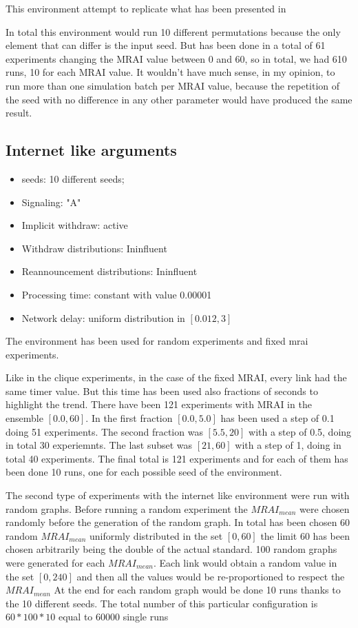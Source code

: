 \documentclass[10pt,conference,letterpaper]{IEEEtran}
\begin{document}
This environment attempt to replicate what has been presented in \cite{griffin2001experimental}

In total this environment would run 10 different permutations because the only
element that can differ is the input seed.
But has been done in a total of \num{61} experiments changing the \ac{MRAI} value between
$0$ and $60$, so in total, we had \num{610} runs, \num{10} for each \ac{MRAI} value.
It wouldn't have much sense, in my opinion, to run more than one simulation batch per
\ac{MRAI} value, because the repetition of the seed with no difference in any
other parameter would have produced the same result.

\subsection{Internet like arguments}
\label{subsec:internet_like_arguments}

\begin{itemize}
	\item seeds: \num{10} different seeds;
	\item Signaling: "A" 
	\item Implicit withdraw: active
	\item Withdraw distributions: Ininfluent
	\item Reannouncement distributions: Ininfluent 
	\item Processing time: constant with value \num{0.00001}
	\item Network delay: uniform distribution in $[0.012, 3]$
\end{itemize} 

The environment has been used for random experiments and fixed mrai experiments.

Like in the clique experiments, in the case of the fixed \ac{MRAI}, every link
had the same timer value.
But this time has been used also fractions of seconds to highlight the trend.
There have been \num{121} experiments with \ac{MRAI} in the ensemble $[0.0, 60]$.
In the first fraction $[0.0, 5.0]$ has been used a step of \num{0.1} doing \num{51}
experiments.
The second fraction was $[5.5, 20]$ with a step of \num{0.5}, doing in total \num{30}
experiemnts.
The last subset was $[21, 60]$ with a step of \num{1}, doing in total \num{40}
experiments.
The final total is \num{121} experiments and for each of them has been done
\num{10} runs, one for each possible seed of the environment.

The second type of experiments with the internet like environment were run 
with random graphs.
Before running a random experiment the $MRAI_{mean}$ were chosen randomly before
the generation of the random graph.
In total has been chosen \num{60} random $MRAI_{mean}$ uniformly distributed
in the set $[0, 60]$ the limit \num{60} has been chosen arbitrarily being the
double of the actual standard.
\num{100} random graphs were generated for each $MRAI_{mean}$.
Each link would obtain a random value in the set $[0, 240]$ and then all the
values would be re-proportioned to respect the $MRAI_{mean}$
At the end for each random graph would be done \num{10} runs thanks to the 10 
different seeds.
The total number of this particular configuration is $60*100*10$ equal to 
\num{60000} single runs 
\end{document}
